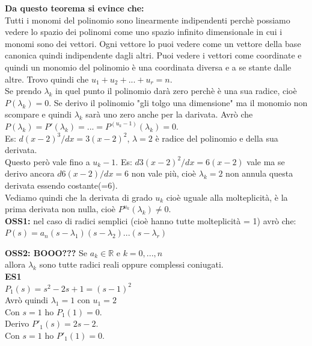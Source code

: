 \textbf{Da questo teorema si evince che:}\\
Tutti i monomi del polinomio sono linearmente indipendenti perchè possiamo vedere lo spazio dei polinomi come uno spazio infinito dimensionale in cui i monomi sono dei vettori. Ogni vettore lo puoi vedere come un vettore della base canonica quindi indipendente dagli altri. Puoi vedere i vettori come coordinate e quindi un monomio del polinomio è una coordinata diversa e a se stante dalle altre. Trovo quindi che $ u_{1}+u_{2}+...+u_{r} = n $.\\
Se prendo $ \lambda_{k} $ in quel punto il polinomio darà zero perchè è una sua radice, cioè $ P(\lambda_{k}) = 0 $. Se derivo il polinomio "gli tolgo una dimensione" ma il monomio non scompare e quindi $ \lambda_{k} $ sarà uno zero anche per la darivata. Avrò che $ P(\lambda_{k}) = P'(\lambda_{k}) = ... = P^{(u_{k}-1)}(\lambda_{k}) = 0 $. \\
Es: $ d(x-2)^3/dx = 3(x-2)^2 $, $ \lambda = 2 $ è radice del polinomio e della sua derivata.\\
Questo però vale fino a $ u_{k}-1 $. Es: $ d 3(x-2)^2/dx = 6(x-2) $ vale ma se derivo ancora $  d 6(x-2)/dx = 6 $ non vale più, cioè $ \lambda_{k} = 2$ non annula questa derivata essendo costante(=6). \\
Vediamo quindi che la derivata di grado $ u_{k} $ cioè uguale alla molteplicità, è la prima derivata non nulla, cioè $ P^{u_{k}}(\lambda_{k}) \neq 0 $.\\

\textbf{OSS1:} nel caso di radici semplici (cioè hanno tutte molteplicità = 1) avrò che:\\
$ P(s) = a_{n} (s- \lambda_{1}) (s- \lambda_{2}) ... (s- \lambda_{r}) $

\textbf{OSS2: BOOO???} Se $ a_{k} \in \mathbb{R}$ e $ k=0,...,n $ \\
allora $ \lambda_{k}$ sono tutte radici reali oppure complessi coniugati.\\

\textbf{ES1}\\
$ P_{1}(s) = s^{2} -2s +1 = (s-1)^{2}$\\
Avrò quindi $ \lambda_{1} = 1$ con $ u_{1} = 2$\\
Con $ s=1 $ ho $ P_{1}(1) = 0$.\\
Derivo $ P'_{1}(s) = 2s - 2$.\\
Con $ s=1 $ ho $ P'_{1}(1) = 0$.\\

